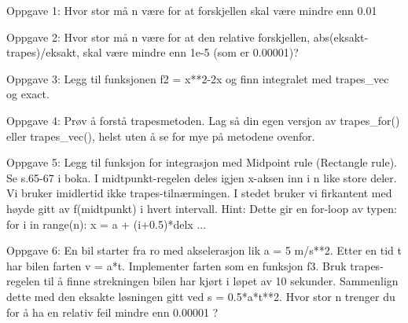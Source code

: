 Oppgave 1: Hvor stor må n være for at forskjellen skal være mindre enn 0.01


Oppgave 2: Hvor stor må n være for at den relative forskjellen, abs(eksakt-trapes)/eksakt, skal være mindre enn 1e-5 (som er 0.00001)? 


Oppgave 3: Legg til funksjonen f2 = x**2-2x og finn integralet med trapes_vec og exact. 


Oppgave 4: Prøv å forstå trapesmetoden. Lag så din egen versjon av trapes_for() eller trapes_vec(), 
helst uten å se for mye på metodene ovenfor. 


Oppgave 5: Legg til funksjon for integrasjon med Midpoint rule (Rectangle rule). 
Se s.65-67 i boka.
I midtpunkt-regelen deles igjen x-aksen inn i n like store deler. 
Vi bruker imidlertid ikke trapes-tilnærmingen.
I stedet bruker vi firkantent med høyde gitt av f(midtpunkt) i hvert intervall.
Hint: Dette gir en for-loop av typen:
    for i in range(n):
        x = a + (i+0.5)*delx
        ... 


Oppgave 6: En bil starter fra ro med akselerasjon lik a = 5 m/s**2.
Etter en tid t har bilen farten v = a*t.
Implementer farten som en funksjon f3. 
Bruk trapes-regelen til å finne strekningen bilen har kjørt i løpet av 10 sekunder. 
Sammenlign dette med den eksakte løsningen gitt ved s = 0.5*a*t**2.
Hvor stor n trenger du for å ha en relativ feil mindre enn 0.00001 ? 
